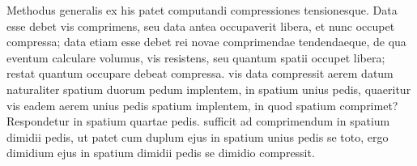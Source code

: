 
 \pstart  Methodus generalis ex his patet computandi compressiones\protect{} tensionesque\protect{}. Data esse debet vis comprimens, seu  data antea occupaverit libera, et nunc occupet compressa; data etiam esse debet rei novae comprimendae tendendaeque, de qua eventum calculare volumus, vis resistens, seu quantum spatii occupet libera; restat  quantum occupare debeat compressa.  vis\protect{} data compressit aerem datum naturaliter spatium duorum pedum implentem, in spatium unius pedis, quaeritur vis eadem aerem unius pedis spatium implentem, in quod spatium comprimet? Respondetur in spatium quartae pedis.  sufficit ad comprimendum in spatium dimidii pedis, ut patet cum duplum ejus in spatium unius pedis se toto, ergo dimidium ejus in spatium dimidii pedis se dimidio compressit.

